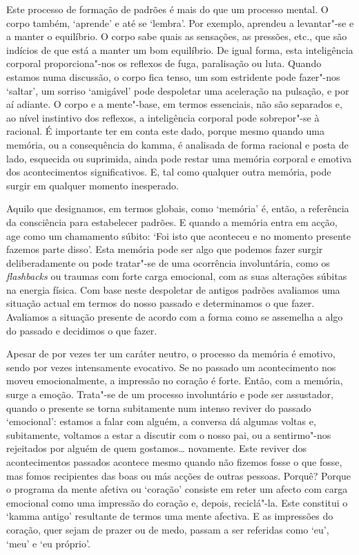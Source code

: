 Este processo de formação de padrões é mais do que um processo mental. O corpo
também, `aprende' e até se `lembra'. Por exemplo, aprendeu a levantar"-se e a
manter o equilíbrio. O corpo sabe quais as sensações, as pressões, etc., que são
indícios de que está a manter um bom equilíbrio. De igual forma, esta
inteligência corporal proporciona"-nos os reflexos de fuga, paralisação ou luta.
Quando estamos numa discussão, o corpo fica tenso, um som estridente pode
fazer"-nos `saltar', um sorriso `amigável' pode despoletar uma aceleração na
pulsação, e por aí adiante. O corpo e a mente"-base, em termos essenciais, não
são separados e, ao nível instintivo dos reflexos, a inteligência corporal pode
sobrepor"-se à racional. É importante ter em conta este dado, porque mesmo quando
uma memória, ou a consequência do kamma, é analisada de forma racional e posta
de lado, esquecida ou suprimida, ainda pode restar uma memória corporal e
emotiva dos acontecimentos significativos. E, tal como qualquer outra memória,
pode surgir em qualquer momento inesperado.

Aquilo que designamos, em termos globais, como `memória' é, então, a referência
da consciência para estabelecer padrões. E quando a memória entra em acção, age
como um chamamento súbito: `Foi isto que aconteceu e no momento presente fazemos
parte disso'. Esta memória pode ser algo que podemos fazer surgir
deliberadamente ou pode tratar"-se de uma ocorrência involuntária, como os
\emph{flashbacks} ou traumas com forte carga emocional, com as suas alterações
súbitas na energia física. Com base neste despoletar de antigos padrões
avaliamos uma situação actual em termos do nosso passado e determinamos o que
fazer. Avaliamos a situação presente de acordo com a forma como se assemelha a
algo do passado e decidimos o que fazer.

Apesar de por vezes ter um caráter neutro, o processo da memória é emotivo,
sendo por vezes intensamente evocativo. Se no passado um acontecimento nos moveu
emocionalmente, a impressão no coração é forte. Então, com a memória, surge a
emoção. Trata"-se de um processo involuntário e pode ser assustador, quando o
presente se torna subitamente num intenso reviver do passado `emocional':
estamos a falar com alguém, a conversa dá algumas voltas e, subitamente,
voltamos a estar a discutir com o nosso pai, ou a sentirmo"-nos rejeitados por
alguém de quem gostamos\ldots{} novamente. Este reviver dos acontecimentos passados
acontece mesmo quando não fizemos fosse o que fosse, mas fomos recipientes das
boas ou más acções de outras pessoas. Porquê? Porque o programa da mente afetiva
ou `coração' consiste em reter um afecto com carga emocional como uma impressão
do coração e, depois, reciclá"-la. Este constitui o `kamma antigo' resultante de
termos uma mente afectiva. E as impressões do coração, quer sejam de prazer ou
de medo, passam a ser referidas como `eu', `meu' e `eu próprio'.

